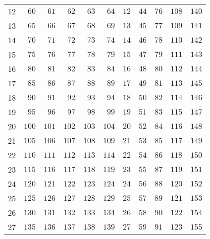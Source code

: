 \begin{table}[H]
\begin{tabular}{r|rrrrr|rrrrr}
        12 & $60$     & $61$     & $62$     & $63$     & $64$     & $12$     & $44$     & $76$     & $108$    & $140$    \\
        13 & $65$     & $66$     & $67$     & $68$     & $69$     & $13$     & $45$     & $77$     & $109$    & $141$    \\
        14 & $70$     & $71$     & $72$     & $73$     & $74$     & $14$     & $46$     & $78$     & $110$    & $142$    \\
        15 & $75$     & $76$     & $77$     & $78$     & $79$     & $15$     & $47$     & $79$     & $111$    & $143$    \\
        16 & $80$     & $81$     & $82$     & $83$     & $84$     & $16$     & $48$     & $80$     & $112$    & $144$    \\
        17 & $85$     & $86$     & $87$     & $88$     & $89$     & $17$     & $49$     & $81$     & $113$    & $145$    \\
        18 & $90$     & $91$     & $92$     & $93$     & $94$     & $18$     & $50$     & $82$     & $114$    & $146$    \\
        19 & $95$     & $96$     & $97$     & $98$     & $99$     & $19$     & $51$     & $83$     & $115$    & $147$    \\
        20 & $100$    & $101$    & $102$    & $103$    & $104$    & $20$     & $52$     & $84$     & $116$    & $148$    \\
        21 & $105$    & $106$    & $107$    & $108$    & $109$    & $21$     & $53$     & $85$     & $117$    & $149$    \\
        22 & $110$    & $111$    & $112$    & $113$    & $114$    & $22$     & $54$     & $86$     & $118$    & $150$    \\
        23 & $115$    & $116$    & $117$    & $118$    & $119$    & $23$     & $55$     & $87$     & $119$    & $151$    \\
        24 & $120$    & $121$    & $122$    & $123$    & $124$    & $24$     & $56$     & $88$     & $120$    & $152$    \\
        25 & $125$    & $126$    & $127$    & $128$    & $129$    & $25$     & $57$     & $89$     & $121$    & $153$    \\
        26 & $130$    & $131$    & $132$    & $133$    & $134$    & $26$     & $58$     & $90$     & $122$    & $154$    \\
        27 & $135$    & $136$    & $137$    & $138$    & $139$    & $27$     & $59$     & $91$     & $123$    & $155$    \\

\end{tabular}
\end{table}
